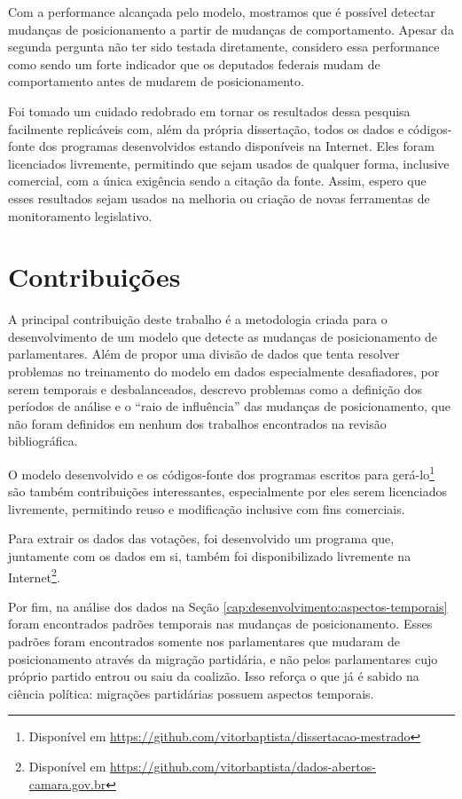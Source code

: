 \documentclass[a4paper,titlepage]{ppgi}\usepackage[]{graphicx}\usepackage[]{color}
\begin{document}
Com a performance alcançada pelo modelo, mostramos que é possível detectar
mudanças de posicionamento a partir de mudanças de comportamento. Apesar da
segunda pergunta não ter sido testada diretamente, considero essa performance
como sendo um forte indicador que os deputados federais mudam de comportamento
antes de mudarem de posicionamento.

Foi tomado um cuidado redobrado em tornar os resultados dessa pesquisa
facilmente replicáveis com, além da própria dissertação, todos os dados e
códigos-fonte dos programas desenvolvidos estando disponíveis na Internet.
Eles foram licenciados livremente, permitindo que sejam usados de qualquer
forma, inclusive comercial, com a única exigência sendo a citação da fonte.
Assim, espero que esses resultados sejam usados na melhoria ou criação de novas
ferramentas de monitoramento legislativo.

\section{Contribuições}

A principal contribuição deste trabalho é a metodologia criada para o
desenvolvimento de um modelo que detecte as mudanças de posicionamento de
parlamentares. Além de propor uma divisão de dados que tenta resolver problemas
no treinamento do modelo em dados especialmente desafiadores, por serem
temporais e desbalanceados, descrevo problemas como a definição dos períodos de
análise e o ``raio de influência'' das mudanças de posicionamento, que não
foram definidos em nenhum dos trabalhos encontrados na revisão bibliográfica.

O modelo desenvolvido e os códigos-fonte dos programas escritos para
gerá-lo\footnote{Disponível em
\url{https://github.com/vitorbaptista/dissertacao-mestrado}} são também
contribuições interessantes, especialmente por eles serem licenciados
livremente, permitindo reuso e modificação inclusive com fins comerciais.

Para extrair os dados das votações, foi desenvolvido um programa que,
juntamente com os dados em si, também foi disponibilizado livremente na
Internet\footnote{Disponível em
\url{https://github.com/vitorbaptista/dados-abertos-camara.gov.br}}.

Por fim, na análise dos dados na Seção
\ref{cap:desenvolvimento:aspectos-temporais} foram encontrados padrões
temporais nas mudanças de posicionamento. Esses padrões foram encontrados
somente nos parlamentares que mudaram de posicionamento através da migração
partidária, e não pelos parlamentares cujo próprio partido entrou ou saiu da
coalizão. Isso reforça o que já é sabido na ciência política: migrações
partidárias possuem aspectos temporais.  
\end{document}
